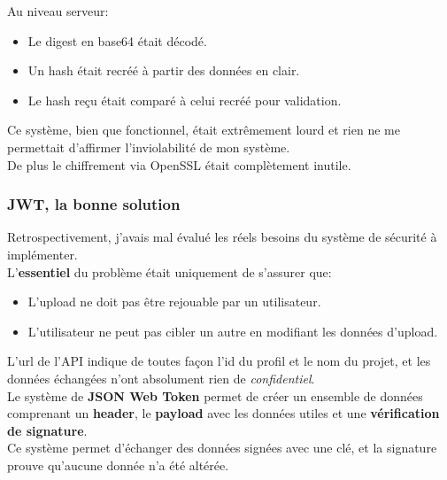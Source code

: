\documentclass{report}
\begin{document}
          Au niveau serveur:\\

          \begin{itemize}
            \item Le digest en base64 était décodé.
            \item Un hash était recréé à partir des données en clair.
            \item Le hash reçu était comparé à celui recréé pour validation.\\
          \end{itemize}

          Ce système, bien que fonctionnel, était extrêmement lourd et rien ne me permettait d'affirmer l'inviolabilité de mon système.\\
          De plus le chiffrement via OpenSSL était complètement inutile.\\

        \subsubsection{JWT, la bonne solution}
        \label{subs:JWT, la bonne solution}

          Retrospectivement, j'avais mal évalué les réels besoins du système de sécurité à implémenter.\\

          L'\textbf{essentiel} du problème était uniquement de s'assurer que:\\

          \begin{itemize}
            \item L'upload ne doit pas être rejouable par un utilisateur.
            \item L'utilisateur ne peut pas cibler un autre en modifiant les données d'upload.\\
          \end{itemize}

          L'url de l'API indique de toutes façon l'id du profil et le nom du projet, et les données échangées n'ont absolument rien de \textit{confidentiel}.\\

          Le système de \textbf{JSON Web Token} permet de créer un ensemble de données comprenant un \textbf{header}, le \textbf{payload}
          avec les données utiles et une \textbf{vérification de signature}.\\
          Ce système permet d'échanger des données signées avec une clé, et la signature prouve qu'aucune donnée n'a été altérée.\\
\end{document}
